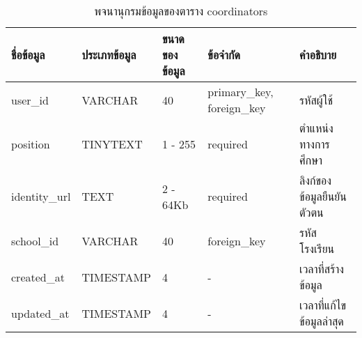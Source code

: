 \begin{table}[H]
    \caption{พจนานุกรมข้อมูลของตาราง coordinators}
    \label{tab:database-coordinators}
    \begin{tabularx}{\textwidth}{ | p{2.45cm} | p{2.20cm} | p{2.45cm} | p{2.15cm} | X | }
    \hline
    \textbf{ชื่อข้อมูล} & \textbf{ประเภทข้อมูล} & \textbf{ขนาดของข้อมูล} & \textbf{ข้อจำกัด} & \textbf{คำอธิบาย} \\
    \hline
    user\_id & VARCHAR & 40 & primary\_key, foreign\_key & รหัสผู้ใช้ \\
    \hline
    position & TINYTEXT & 1 - 255 & required & ตำแหน่งทางการศึกษา \\
    \hline
    identity\_url & TEXT & 2 - 64Kb & required & ลิงก์ของข้อมูลยืนยันตัวตน \\
    \hline
    school\_id & VARCHAR & 40 & foreign\_key & รหัสโรงเรียน \\
    \hline
    created\_at & TIMESTAMP & 4 & - & เวลาที่สร้างข้อมูล \\
    \hline
    updated\_at & TIMESTAMP & 4 & - & เวลาที่แก้ไขข้อมูลล่าสุด \\
    \hline
    \end{tabularx}
\end{table}
